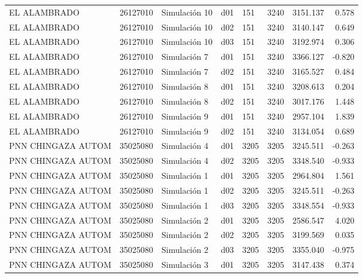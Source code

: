\begin{landscape}
\begin{longtable}{lrlp{2cm}p{2cm}p{3cm}p{2cm}r}
            EL ALAMBRADO &  26127010 &  Simulación 10 &   d01 &       151 &     3240 &  3151.137 &     0.578 \\
            EL ALAMBRADO &  26127010 &  Simulación 10 &   d02 &       151 &     3240 &  3140.147 &     0.649 \\
            EL ALAMBRADO &  26127010 &  Simulación 10 &   d03 &       151 &     3240 &  3192.974 &     0.306 \\
            EL ALAMBRADO &  26127010 &   Simulación 7 &   d01 &       151 &     3240 &  3366.127 &    -0.820 \\
            EL ALAMBRADO &  26127010 &   Simulación 7 &   d02 &       151 &     3240 &  3165.527 &     0.484 \\
            EL ALAMBRADO &  26127010 &   Simulación 8 &   d01 &       151 &     3240 &  3208.613 &     0.204 \\
            EL ALAMBRADO &  26127010 &   Simulación 8 &   d02 &       151 &     3240 &  3017.176 &     1.448 \\
            EL ALAMBRADO &  26127010 &   Simulación 9 &   d01 &       151 &     3240 &  2957.104 &     1.839 \\
            EL ALAMBRADO &  26127010 &   Simulación 9 &   d02 &       151 &     3240 &  3134.054 &     0.689 \\
      PNN CHINGAZA AUTOM &  35025080 &   Simulación 4 &   d01 &      3205 &     3205 &  3245.511 &    -0.263 \\
      PNN CHINGAZA AUTOM &  35025080 &   Simulación 4 &   d02 &      3205 &     3205 &  3348.540 &    -0.933 \\
      PNN CHINGAZA AUTOM &  35025080 &   Simulación 1 &   d01 &      3205 &     3205 &  2964.804 &     1.561 \\
      PNN CHINGAZA AUTOM &  35025080 &   Simulación 1 &   d02 &      3205 &     3205 &  3245.511 &    -0.263 \\
      PNN CHINGAZA AUTOM &  35025080 &   Simulación 1 &   d03 &      3205 &     3205 &  3348.554 &    -0.933 \\
      PNN CHINGAZA AUTOM &  35025080 &   Simulación 2 &   d01 &      3205 &     3205 &  2586.547 &     4.020 \\
      PNN CHINGAZA AUTOM &  35025080 &   Simulación 2 &   d02 &      3205 &     3205 &  3199.569 &     0.035 \\
      PNN CHINGAZA AUTOM &  35025080 &   Simulación 2 &   d03 &      3205 &     3205 &  3355.040 &    -0.975 \\
      PNN CHINGAZA AUTOM &  35025080 &   Simulación 3 &   d01 &      3205 &     3205 &  3147.438 &     0.374 \\

\end{longtable}
\end{landscape}
